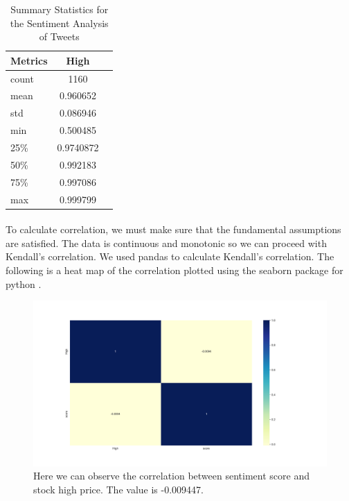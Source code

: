 \documentclass[12pt, letterpaper, titlepage]{article}
\begin{document}
\begin{table}[!hb]
  \begin{center}
    \caption{Summary Statistics for the Sentiment Analysis of Tweets}
    \label{tab:table2}
    \begin{tabular}{l|c|r} %
      \textbf{Metrics} & \textbf{High} \\
      \hline
      count & 1160 \\
      mean & 0.960652 \\
      std & 0.086946 \\
      min & 0.500485 \\
      25\% & 0.9740872 \\
      50\% & 0.992183 \\
      75\% & 0.997086 \\
      max & 0.999799 \\
    \end{tabular}
  \end{center}
\end{table}

\paragraph{}
To calculate correlation, we must make sure that the fundamental assumptions are satisfied. The data is continuous and monotonic so we can proceed with Kendall's correlation. We used pandas to calculate Kendall's correlation. The following is a heat map of the correlation plotted using the seaborn package for python \citep{Waskom2021}.

\begin{figure}[H]
  \begin{center}
  \includegraphics[width=\textwidth]{../figures/fig2.pdf}
  \caption{Here we can observe the correlation between sentiment score and stock high price. The value is -0.009447. }\label{fig:fig2}
  \end{center}
\end{figure}
\end{document}
